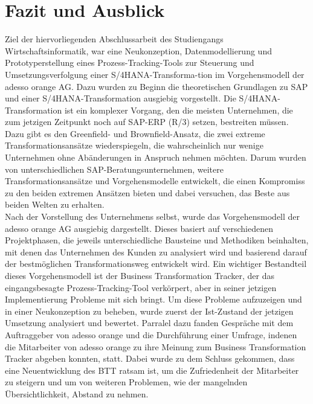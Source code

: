 \section{Fazit und Ausblick}
Ziel der hiervorliegenden Abschlussarbeit des Studiengangs Wirtschaftsinformatik, war eine Neukonzeption, Datenmodellierung und Prototyperstellung eines Prozess-Tracking-Tools zur Steuerung und Umsetzungsverfolgung einer S/4HANA-Transforma-tion im Vorgehensmodell der adesso orange AG. Dazu wurden zu Beginn die theoretischen Grundlagen zu SAP und einer S/4HANA-Transformation ausgiebig vorgestellt. Die S/4HANA-Transformation ist ein komplexer Vorgang, den die meisten Unternehmen, die zum jetzigen Zeitpunkt noch auf SAP-ERP (R/3) setzen, bestreiten müssen. Dazu gibt es den Greenfield- und Brownfield-Ansatz, die zwei extreme Transformationsansätze wiederspiegeln, die wahrscheinlich nur wenige Unternehmen ohne Abänderungen in Anspruch nehmen möchten. Darum wurden von unterschiedlichen SAP-Beratungsunternehmen, weitere Transformationsansätze und Vorgehensmodelle entwickelt, die einen Kompromiss zu den beiden extremen Ansätzen bieten und dabei versuchen, das \glqq{}Beste aus beiden Welten\grqq{} zu erhalten.\\Nach der Vorstellung des Unternehmens selbst, wurde das Vorgehensmodell der adesso orange AG ausgiebig dargestellt. Dieses basiert auf verschiedenen Projektphasen, die jeweils unterschiedliche Bausteine und Methodiken beinhalten, mit denen das Unternehmen des Kunden zu analysiert wird und basierend darauf der bestmöglichen Transformationsweg entwickelt wird. Ein wichtiger Bestandteil dieses Vorgehensmodell ist der Business Transformation Tracker, der das eingangsbesagte Prozess-Tracking-Tool verkörpert, aber in seiner jetzigen Implementierung Probleme mit sich bringt. Um diese Probleme aufzuzeigen und in einer Neukonzeption zu beheben, wurde zuerst der Ist-Zustand der jetzigen Umsetzung analysiert und bewertet. Parralel dazu fanden Gespräche mit dem Auftraggeber von adesso orange und die Durchführung einer Umfrage, indenen die Mitarbeiter von adesso orange zu ihre Meinung zum Business Transformation Tracker abgeben konnten, statt. Dabei wurde zu dem Schluss gekommen, dass eine Neuentwicklung des BTT ratsam ist, um die Zufriedenheit der Mitarbeiter zu steigern und um von weiteren Problemen, wie der mangelnden Übersichtlichkeit, Abstand zu nehmen. 
